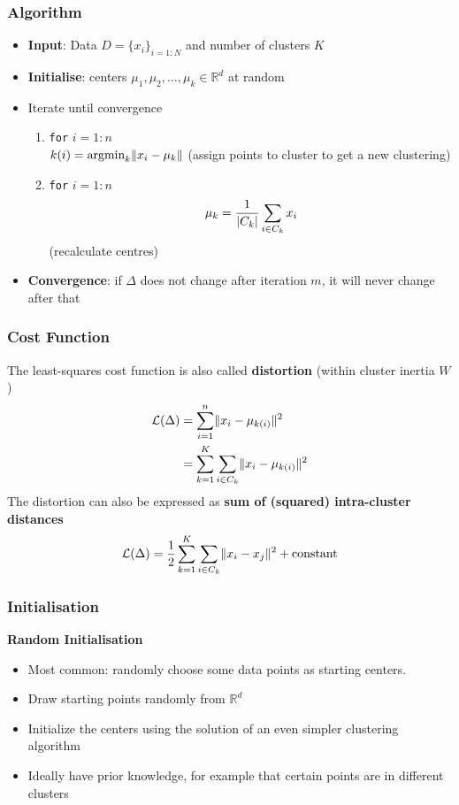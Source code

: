 \documentclass[11pt]{article}
\theoremstyle{definition}
\newcommand*\R{\mathbb{R}}
\DeclarePairedDelimiter\abs{\lvert}{\rvert}
\DeclarePairedDelimiter\norm{\lVert}{\rVert}
\begin{document}
\subsubsection{Algorithm}
\begin{itemize}
	\item \textbf{Input}: Data $D = \{ x_i \}_{i=1:N}$ and number of clusters $K$
	\item \textbf{Initialise}: centers $\mu_1,\mu_2,\dots,\mu_k \in \R^d$ at random
	\item Iterate until convergence
	\begin{enumerate}
		\item \texttt{for} $i=1:n$\\
		$k(i) = \text{argmin}_k\norm{x_i - \mu_k}$ (assign points to cluster to get a new clustering)
		\item \texttt{for} $i=1:n$\\
		\begin{equation*}
			\mu_k = \frac{1}{\abs{C_k}}\sum_{i\in C_k} x_i
		\end{equation*}
		(recalculate centres)
	\end{enumerate}
	\item \textbf{Convergence}: if $\Delta$ does not change after iteration $m$, it will never change after that
\end{itemize}

\subsubsection{Cost Function}
The least-squares cost function is also called \textbf{distortion} (within cluster inertia $W$)
\begin{align*}
	\mathcal{L}(\Delta) &= \sum_{i=1}^{n}\norm{x_i - \mu_{k(i)}}^2\\
	&= \sum_{k=1}^{K}\sum_{i\in C_k} \norm{x_i - \mu_{k(i)}}^2
\end{align*}
The distortion can also be expressed as \textbf{sum of (squared) intra-cluster distances}
\begin{equation*}
	\mathcal{L}(\Delta) = \frac{1}{2} \sum_{k=1}^{K}\sum_{i\in C_k} \norm{x_i - x_j}^2 + \text{constant}
\end{equation*}

\subsubsection{Initialisation}
\textbf{Random Initialisation}
\begin{itemize}[nosep]
	\item Most common: randomly choose some data points as starting centers.
	\item Draw starting points randomly from $\R^d$
	\item Initialize the centers using the solution of an even simpler clustering algorithm
	\item Ideally have prior knowledge, for example that certain points are in different clusters
\end{itemize}
\end{document}
